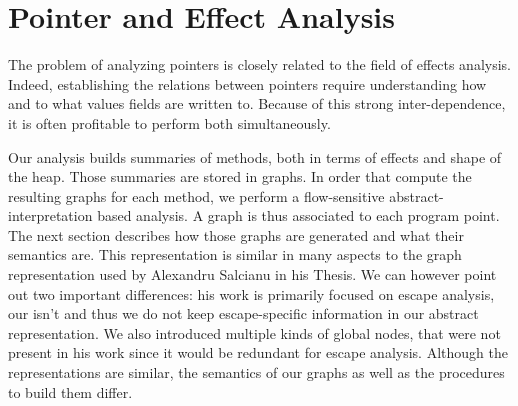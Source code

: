 \chapter{Pointer and Effect Analysis}
\label{chap:pointer}
The problem of analyzing pointers is closely related to the field of effects
analysis. Indeed, establishing the relations between pointers require
understanding how and to what values fields are written to. Because of this
strong inter-dependence, it is often profitable to perform both simultaneously.

Our analysis builds summaries of methods, both in terms of effects and shape of
the heap. Those summaries are stored in graphs. In order that compute the
resulting graphs for each method, we perform a flow-sensitive
abstract-interpretation based analysis. A graph is thus associated to each
program point. The next section describes how those graphs are generated and
what their semantics are. This representation is similar in many aspects to
the graph representation used by Alexandru Salcianu in his Thesis. We can %
however point out two important differences: his work is primarily focused on
escape analysis, our isn't and thus we do not keep escape-specific information
in our abstract representation. We also introduced multiple kinds of global
nodes, that were not present in his work since it would be redundant for escape
analysis. Although the representations are similar, the semantics of our graphs
as well as the procedures to build them differ.

